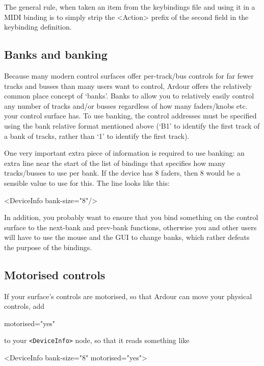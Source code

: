 \documentclass[10pt,a4paper]{book}
\begin{document}
The general rule, when taken an item from the keybindings file and
using it in a MIDI binding is to simply strip the <Action> prefix of
the second field in the keybinding definition.

\subsection{Banks and banking}

Because many modern control surfaces offer per-track/bus controls for
far fewer tracks and busses than many users want to control, Ardour
offers the relatively common place concept of `banks'. Banks to allow
you to relatively easily control any number of tracks and/or busses
regardless of how many faders/knobs etc. your control surface has. To
use banking, the control addresses must be specified using the bank
relative format mentioned above (`B1' to identify the first track of a
bank of tracks, rather than `1' to identify the first track).

One very important extra piece of information is required to use
banking: an extra line near the start of the list of bindings that
specifies how many tracks/busses to use per bank. If the device has 8
faders, then 8 would be a sensible value to use for this. The line
looks like this:

\begin{listing}
<DeviceInfo bank-size="8"/>
\end{listing}

In addition, you probably want to ensure that you bind something on
the control surface to the next-bank and prev-bank functions,
otherwise you and other users will have to use the mouse and the GUI
to change banks, which rather defeats the purpose of the bindings.

\subsection{Motorised controls}

If your surface's controls are motorised, so that Ardour can move your physical controls,
add

\begin{listing}
motorised="yes"
\end{listing}

to your \texttt{<DeviceInfo>} node, so that it reads something like

\begin{listing}
<DeviceInfo bank-size="8" motorised="yes">
\end{listing}
\end{document}
